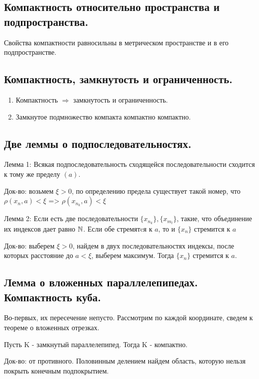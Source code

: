 \documentclass[12pt, a4paper]{article}
\begin{document}
\subsection{Компактность относительно пространства и подпространства.}

Свойства компактности равносильны 
в метрическом пространстве и в его подпространстве.


\subsection{Компактность, замкнутость и ограниченность.}

\begin{enumerate}
    \item Компактность $\Rightarrow$ замкнутость и ограниченность.
    \item Замкнутое подмножество компакта компактно компактно.
\end{enumerate}


\subsection{Две леммы о подпоследовательностях.}

Лемма 1: Всякая подпоследовательность сходящейся последовательности сходится к тому же пределу $(a)$.

Док-во: возьмем $\xi > 0$, по определению предела существует такой номер, что $\rho(x_n, a) < \xi$ =>  $\rho(x_{n_k}, a) < \xi$

Лемма 2: Если есть две последовательности $\{x_{n_k}\}, \{x_{m_l}\}$, такие, что объединение их индексов дает равно ${\mathbb{N}}$. Если обе стремятcя к $a$, то и $\{x_n\}$ стремится к $a$

Док-во: выберем $\xi > 0$, найдем в двух последовательностях индексы, после которых расстояние до $a < \xi$, выберем максимум. Тогда $\{x_n\}$ стремится к $a$.

\subsection{Лемма о вложенных параллелепипедах. Компактность куба.}

Во-первых, их пересечение непусто. 
Рассмотрим по каждой координате, 
сведем к теореме о вложенных отрезках. 

Пусть K - замкнутый параллелепипед. Тогда K - компактно.

Док-во: от противного.
Половинным делением найдем область, 
которую нельзя покрыть конечным подпокрытием. 
\end{document}
